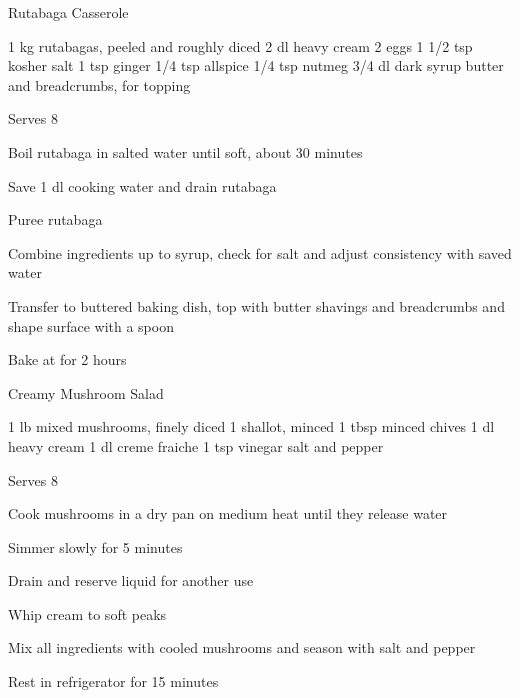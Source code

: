 \begin{denserecipe}{Rutabaga Casserole}{}
\begin{ingredients}
1 kg rutabagas, peeled and roughly diced
2 dl heavy cream
2 eggs
1 1/2 tsp kosher salt
1 tsp ginger
1/4 tsp allspice
1/4 tsp nutmeg
3/4 dl dark syrup
butter and breadcrumbs, for topping
\end{ingredients}
\nextcolumn
Serves 8
\begin{steps}
    \item Boil rutabaga in salted water until soft, about 30 minutes
    \item Save 1 dl cooking water and drain rutabaga
    \item Puree rutabaga
    \item Combine ingredients up to syrup, check for salt and adjust consistency with saved water
    \item Transfer to buttered baking dish, top with butter shavings and breadcrumbs and shape surface with a spoon
    \item Bake at  for 2 hours
\end{steps}
\end{denserecipe}

\begin{recipe}{Creamy Mushroom Salad}{} %
\begin{ingredients}
1 lb mixed mushrooms, finely diced
1 shallot, minced
1 tbsp minced chives
1 dl heavy cream
1 dl creme fraiche
1 tsp vinegar
salt and pepper
\end{ingredients}
\nextcolumn
Serves 8
\begin{steps}
    \item Cook mushrooms in a dry pan on medium heat until they release water
    \item Simmer slowly for 5 minutes
    \item Drain and reserve liquid for another use
    \item Whip cream to soft peaks
    \item Mix all ingredients with cooled mushrooms and season with salt and pepper
    \item Rest in refrigerator for 15 minutes
\end{steps}
\end{recipe}

